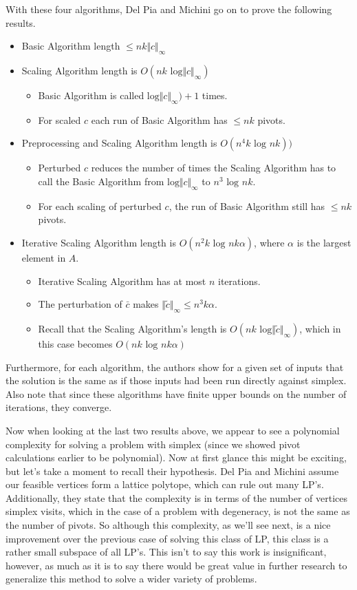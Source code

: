 \documentclass[11pt]{article}
\begin{document}
With these four algorithms, Del Pia and Michini go on to prove the following results.
\begin{itemize}
	\item Basic Algorithm length $\leq nk \Vert c \Vert_\infty$
	\item Scaling Algorithm length is $O(nk \text{ log}\Vert c \Vert_\infty)$
	\begin{itemize}
		\item Basic Algorithm is called $\text{log}\Vert c \Vert_\infty) + 1$ times.
		\item For scaled $c$ each run of Basic Algorithm has $\leq nk$ pivots.
	\end{itemize}
	\item Preprocessing and Scaling Algorithm length is $O(n^4k \text{ log } nk))$
	\begin{itemize}
		\item Perturbed $c$ reduces the number of times the Scaling Algorithm has to call the Basic Algorithm from $\text{log} \Vert c \Vert_\infty$ to $n^3 \text{ log } nk$.
		\item For each scaling of perturbed $c$, the run of Basic Algorithm still has $\leq nk$ pivots.
	\end{itemize}
	\item Iterative Scaling Algorithm length is $O(n^2 k \text{ log } nk\alpha)$, where $\alpha$ is the largest element in $A$.
	\begin{itemize}
		\item Iterative Scaling Algorithm has at most $n$ iterations.
		\item The perturbation of $\bar{c}$ makes $\Vert \tilde{c} \Vert_\infty \leq n^3 k \alpha$.
		\item Recall that the Scaling Algorithm's length is $O(nk \text{ log}\Vert \tilde{c} \Vert_\infty)$, which in this case becomes $O(nk \text{ log } n k \alpha)$
	\end{itemize}
\end{itemize}
Furthermore, for each algorithm, the authors show for a given set of inputs that the solution is the same as if those inputs had been run directly against simplex. Also note that since these algorithms have finite upper bounds on the number of iterations, they converge.

Now when looking at the last two results above, we appear to see a polynomial complexity for solving a problem with simplex (since we showed pivot calculations earlier to be polynomial). Now at first glance this might be exciting, but let's take a moment to recall their hypothesis. Del Pia and Michini assume our feasible vertices form a lattice polytope, which can rule out many LP's. Additionally, they state that the complexity is in terms of the number of vertices simplex visits, which in the case of a problem with degeneracy, is not the same as the number of pivots. So although this complexity, as we'll see next, is a nice improvement over the previous case of solving this class of LP, this class is a rather small subspace of all LP's. This isn't to say this work is insignificant, however, as much as it is to say there would be great value in further research to generalize this method to solve a wider variety of problems.
\end{document}
